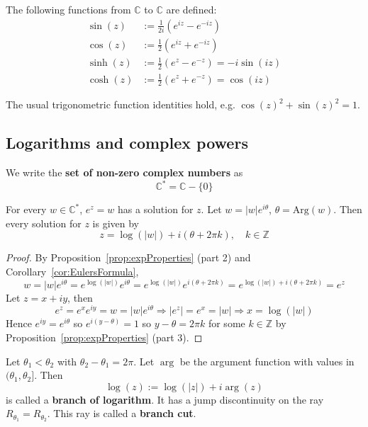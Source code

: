 \begin{definition}
	The following functions from $\mathbb{C}$ to $\mathbb{C}$ are defined:
	\[
		\begin{aligned}
			\sin(z) & := \frac{1}{2i} \left( e^{iz} - e^{-iz} \right) \\
			\cos(z) & := \frac{1}{2} \left( e^{iz} + e^{-iz} \right) \\
			\sinh(z) & := \frac{1}{2} \left( e^{z} - e^{-z} \right) = -i \sin(iz) \\
			\cosh(z) & := \frac{1}{2} \left( e^{z} + e^{-z} \right) = \cos(iz)
		\end{aligned}
	\]
\end{definition}

\begin{remark}
	The usual trigonometric function identities hold, e.g. $\cos(z)^2 + \sin(z)^2 = 1$.
\end{remark}

\subsection{Logarithms and complex powers}

\begin{definition}
	We write the \textbf{set of non-zero complex numbers} as
	\[
		\mathbb{C}^* = \mathbb{C} - \{ 0 \}
	\]
\end{definition}

\begin{lemma}
	For every $w \in \mathbb{C}^*$, $e^z = w$ has a solution for $z$. Let $w = |w| e^{i \theta}$, $\theta = \text{Arg}(w)$. Then every solution for $z$ is given by
	\[
		z = \log(|w|) + i (\theta + 2 \pi k), \quad k \in \mathbb{Z}
	\]
\end{lemma}

\begin{proof}
	By Proposition~\ref{prop:expProperties} (part 2) and Corollary~\ref{cor:EulersFormula},
	\[
		w = |w| e^{i \theta} = e^{\log(|w|)} e^{i \theta} = e^{\log(|w|)} e^{i (\theta + 2 \pi k)} = e^{\log(|w|) + i (\theta + 2 \pi k)} = e^z
	\]
	Let $z = x + iy$, then
	\[
		e^z = e^x e^{iy} = w = |w| e^{i \theta} \Longrightarrow |e^z| = e^x = |w| \Longrightarrow x = \log(|w|)
	\]
	Hence $e^{iy} = e^{i \theta}$ so $e^{i(y - \theta)} = 1$ so $y - \theta = 2 \pi k$ for some $k \in \mathbb{Z}$ by Proposition~\ref{prop:expProperties} (part 3).
\end{proof}

\begin{definition}
	Let $\theta_1 < \theta_2$ with $\theta_2 - \theta_1 = 2 \pi$. Let $\arg$ be the argument function with values in $(\theta_1, \theta_2]$. Then
	\[
		\log(z) := \log(|z|) + i \arg(z)
	\]
	is called a \textbf{branch of logarithm}. It has a jump discontinuity on the ray $R_{\theta_1} = R_{\theta_2}$. This ray is called a \textbf{branch cut}.
\end{definition}

